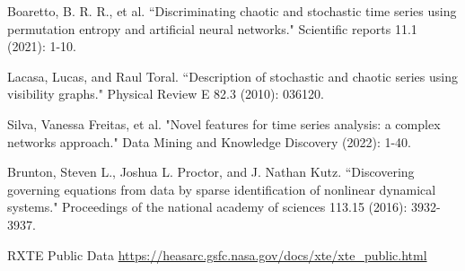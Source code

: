 \documentclass[journal]{IEEEtran}
\begin{document}
\begin{thebibliography}{1}
Boaretto, B. R. R., et al. ``Discriminating chaotic and stochastic time series using permutation entropy and artificial neural networks." Scientific reports 11.1 (2021): 1-10.

Lacasa, Lucas, and Raul Toral. ``Description of stochastic and chaotic series using visibility graphs." Physical Review E 82.3 (2010): 036120.

Silva, Vanessa Freitas, et al. "Novel features for time series analysis: a complex networks approach." Data Mining and Knowledge Discovery (2022): 1-40.

Brunton, Steven L., Joshua L. Proctor, and J. Nathan Kutz. ``Discovering governing equations from data by sparse identification of nonlinear dynamical systems." Proceedings of the national academy of sciences 113.15 (2016): 3932-3937.



RXTE Public Data \url{https://heasarc.gsfc.nasa.gov/docs/xte/xte_public.html}

\end{thebibliography}

	
\end{document}
